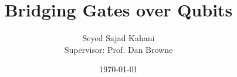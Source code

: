 \documentclass{report}
\title{Bridging Gates over Qubits}
\author{Seyed Sajad Kahani \\Supervisor: Prof. Dan Browne}
\date{\today}
\begin{document}
\maketitle

\tableofcontents

\begin{abstract}
  
\end{abstract}









\printbibliography
\end{document}
